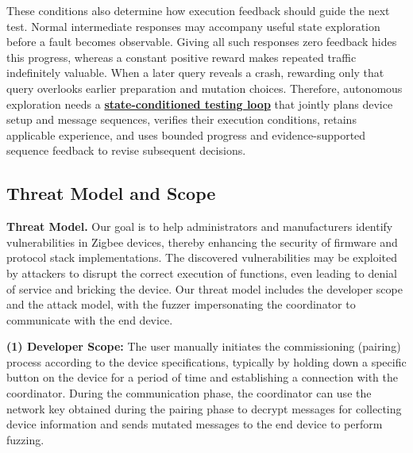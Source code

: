 \documentclass[10pt,journal,compsoc]{IEEEtran}
\begin{document}
These conditions also determine how execution feedback should guide the next test. Normal intermediate responses may accompany useful state exploration before a fault becomes observable. Giving all such responses zero feedback hides this progress, whereas a constant positive reward makes repeated traffic indefinitely valuable. When a later query reveals a crash, rewarding only that query overlooks earlier preparation and mutation choices. Therefore, autonomous exploration needs a \textbf{\underline{state-conditioned testing loop}} that jointly plans device setup and message sequences, verifies their execution conditions, retains applicable experience, and uses bounded progress and evidence-supported sequence feedback to revise subsequent decisions.

\subsection{Threat Model and Scope}

\textbf{Threat Model.} Our goal is to help administrators and manufacturers identify vulnerabilities in Zigbee devices, thereby enhancing the security of firmware and protocol stack implementations. The discovered vulnerabilities may be exploited by attackers to disrupt the correct execution of functions, even leading to denial of service and bricking the device. Our threat model includes the developer scope and the attack model, with the fuzzer impersonating the coordinator to communicate with the end device.


\textbf{(1) Developer Scope:} The user manually initiates the commissioning (pairing) process according to the device specifications, typically by holding down a specific button on the device for a period of time and establishing a connection with the coordinator. During the communication phase, the coordinator can use the network key obtained during the pairing phase to decrypt messages for collecting device information and sends mutated messages to the end device to perform fuzzing. \vspace{0.1cm}
\end{document}
